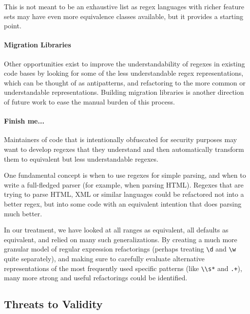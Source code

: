 \noindent This is not meant to be an exhaustive list as regex languages with richer feature sets may have even more equivalence classes available, but it provides a starting point.

\paragraph{Migration Libraries}
Other opportunities exist to improve the understandability of regexes in existing code bases
by looking for some of the less understandable regex representations, which can be thought of as antipatterns, and refactoring to the more common or understandable representations. Building migration libraries is another direction of future work to ease the manual burden of this process.

\paragraph{Finish me...}
Maintainers of code that is intentionally obfuscated for security purposes may want to develop regexes that they understand and then automatically transform them to equivalent but less understandable regexes.

One fundamental concept is when to use regexes for simple parsing, and when to write a full-fledged parser (for example, when parsing HTML).  Regexes that are trying to parse HTML, XML or similar languages could be refactored not into a better regex, but into some code with an equivalent intention that does parsing much better.

In our treatment, we have looked at all ranges as equivalent, all defaults as equivalent, and relied on many such generalizations.  By creating a much more granular model of regular expression refactorings (perhaps treating \verb!\d! and \verb!\w! quite separately), and making sure to carefully evaluate alternative representations of the most frequently used specific patterns (like \verb!\\s*! and \verb!.+!), many more strong and useful refactorings could be identified.



\subsection{Threats to Validity}

